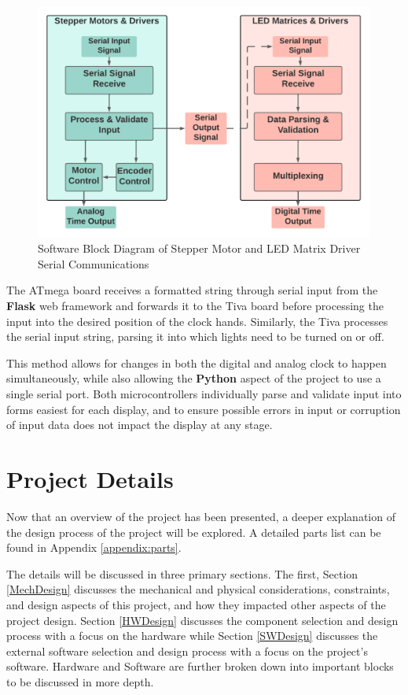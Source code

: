 \documentclass[11pt]{article}
\begin{document}
\begin{figure}[H]
\centering
\includegraphics[width=4.4in]{LED_Motor_Block_diagram.png}
\caption{Software Block Diagram of Stepper Motor and LED Matrix Driver Serial Communications}
\label{SerialBlock}
\end{figure}

The ATmega board receives a formatted string through serial input from the \textbf{Flask} web framework and forwards it to the Tiva board before processing the input into the desired position of the clock hands. 
Similarly, the Tiva processes the serial input string, parsing it into which lights need to be turned on or off. 

This method allows for changes in both the digital and analog clock to happen simultaneously, while also allowing the \textbf{Python} aspect of the project to use a single serial port. 
Both microcontrollers individually parse and validate input into forms easiest for each display, and to ensure possible errors in input or corruption of input data does not impact the display at any stage. 

\section{Project Details}
\label{details}

Now that an overview of the project has been presented, a deeper explanation of the design process of the project will be explored. 
A detailed parts list can be found in Appendix \ref{appendix:parts}.

The details will be discussed in three primary sections. 
The first, Section \ref{MechDesign} discusses the mechanical and physical considerations, constraints, and design aspects of this project, and how they impacted other aspects of the project design. 
Section \ref{HWDesign} discusses the component selection and design process with a focus on the hardware while Section \ref{SWDesign} discusses the external software selection and design process with a focus on the project's software. 
Hardware and Software are further broken down into important blocks to be discussed in more depth. 
\end{document}
